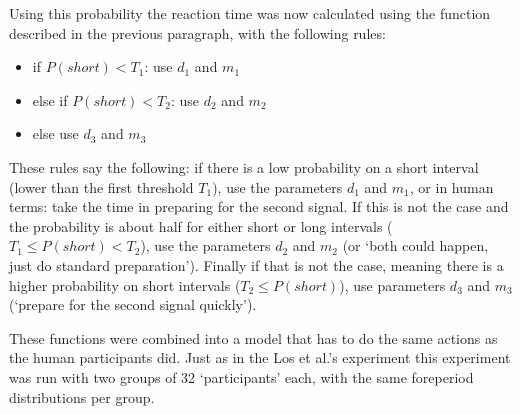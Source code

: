 \documentclass[10pt,letterpaper]{article}
\begin{document}
Using this probability the reaction time was now calculated using the function described in the previous paragraph, with the following rules:
\begin{itemize}
	\item if $P(short) < T_1$: use $d_1$ and $m_1$
	\item else if $P(short) < T_2$: use $d_2$ and $m_2$
	\item else use $d_3$ and $m_3$
\end{itemize}
These rules say the following: if there is a low probability on a short interval (lower than the first threshold $T_1$), use the parameters $d_1$ and $m_1$, or in human terms: take the time in preparing for the second signal. If this is not the case and the probability is about half for either short or long intervals ($T_1 \leq P(short) < T_2$), use the parameters $d_2$ and $m_2$ (or `both could happen, just do standard preparation'). Finally if that is not the case, meaning there is a higher probability on short intervals ($T_2 \leq P(short)$), use parameters $d_3$ and $m_3$ (`prepare for the second signal quickly').
\bigskip

\noindent These functions were combined into a model that has to do the same actions as the human participants did. Just as in the Los et al.'s experiment this experiment was run with two groups of 32 `participants' each, with the same foreperiod distributions per group.
\end{document}
